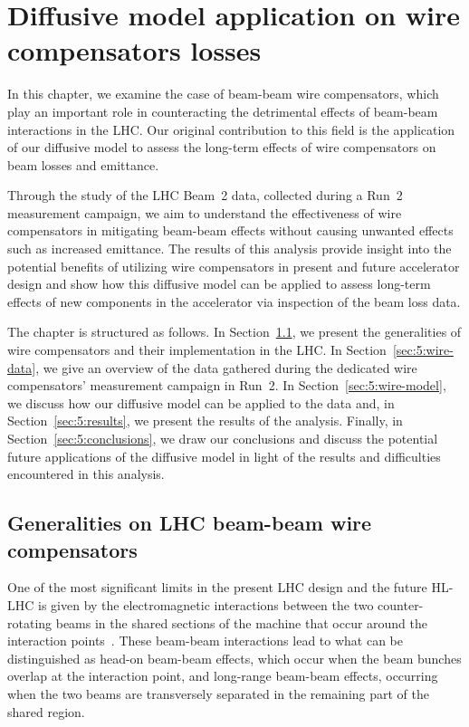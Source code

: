 \chapter{Diffusive model application on wire compensators losses}\label{ch:wire-compensators}

In this chapter, we examine the case of beam-beam wire compensators, which play an important role in counteracting the detrimental effects of beam-beam interactions in the LHC. Our original contribution to this field is the application of our diffusive model to assess the long-term effects of wire compensators on beam losses and emittance.

Through the study of the LHC Beam~2 data, collected during a Run~2 measurement campaign, we aim to understand the effectiveness of wire compensators in mitigating beam-beam effects without causing unwanted effects such as increased emittance. The results of this analysis provide insight into the potential benefits of utilizing wire compensators in present and future accelerator design and show how this diffusive model can be applied to assess long-term effects of new components in the accelerator via inspection of the beam loss data.

The chapter is structured as follows. In Section~\ref{sec:5:wire-compensators}, we present the generalities of wire compensators and their implementation in the LHC. In Section~\ref{sec:5:wire-data}, we give an overview of the data gathered during the dedicated wire compensators' measurement campaign in Run~2. In Section~\ref{sec:5:wire-model}, we discuss how our diffusive model can be applied to the data and, in Section~\ref{sec:5:results}, we present the results of the analysis. Finally, in Section~\ref{sec:5:conclusions}, we draw our conclusions and discuss the potential future applications of the diffusive model in light of the results and difficulties encountered in this analysis.

\section{Generalities on LHC beam-beam wire compensators}\label{sec:5:wire-compensators}

One of the most significant limits in the present LHC design and the future HL-LHC is given by the electromagnetic interactions between the two counter-rotating beams in the shared sections of the machine that occur around the interaction points~\cite{Arduini_2016}. These beam-beam interactions lead to what can be distinguished as head-on beam-beam effects, which occur when the beam bunches overlap at the interaction point, and long-range beam-beam effects, occurring when the two beams are transversely separated in the remaining part of the shared region.


